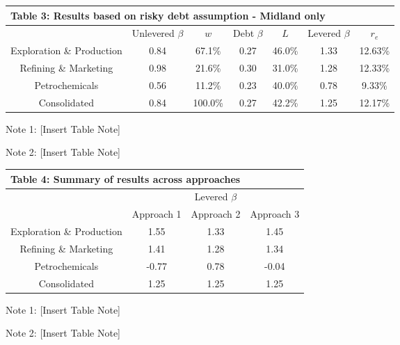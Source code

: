 \documentclass[AER]{AEA}
\begin{document}
\begin{spacing}{1.5}
\begin{table}[h!]
    \centering
    \begin{tabular}{|c|c|c|c|c|c|c|}
    \multicolumn{7}{l}{\textbf{Table 3: Results based on risky debt assumption - Midland only}}\\
    \hline
     & Unlevered $\beta$ & $w$ & Debt $\beta$ & $L$ & Levered $\beta$ & $r_e$\\
     \hline
    Exploration \& Production & 0.84 & 67.1\% & 0.27 & 46.0\% & 1.33 & 12.63\% \\
    \hline
    Refining \& Marketing & 0.98 & 21.6\% & 0.30 & 31.0\% & 1.28 & 12.33\% \\
    \hline
    Petrochemicals & 0.56 & 11.2\% & 0.23 & 40.0\% & 0.78 & 9.33\% \\
    \hline
    Consolidated & 0.84 & 100.0\% & 0.27 & 42.2\% & 1.25 & 12.17\% \\
    \hline
    \end{tabular}
    \begin{tablenotes}
    \item Note 1: [Insert Table Note]
    \item Note 2: [Insert Table Note]
    \end{tablenotes}
\end{table}

\begin{table}[h!]
    \centering
    \begin{tabular}{|c|c|c|c|}
    \multicolumn{4}{l}{\textbf{Table 4: Summary of results across approaches}}\\
    \hline
    \multirow{2}{*}{} & \multicolumn{3}{|c|}{Levered $\beta$} \\
    \cline{2-4}
     & Approach 1 & Approach 2 & Approach 3 \\
     \hline
    Exploration \& Production & 1.55 & 1.33 & 1.45 \\
    \hline
    Refining \& Marketing & 1.41 & 1.28 & 1.34 \\
    \hline
    Petrochemicals & -0.77 & 0.78 & -0.04 \\
    \hline
    Consolidated & 1.25 & 1.25 & 1.25 \\
    \hline
    \end{tabular}
    \begin{tablenotes}
    \item Note 1: [Insert Table Note]
    \item Note 2: [Insert Table Note]
    \end{tablenotes}
\end{table}


\end{spacing}
\end{document}
